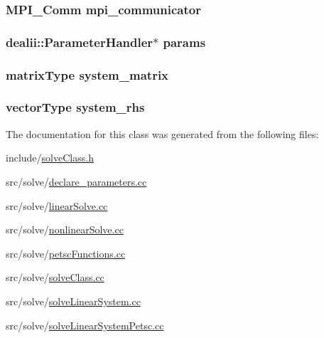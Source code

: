 \subsubsection[{mpi\-\_\-communicator}]{\setlength{\rightskip}{0pt plus 5cm}M\-P\-I\-\_\-\-Comm mpi\-\_\-communicator}\label{classsolve_class_a03728ed636ca889ae407c84d181bc611}
\subsubsection[{params}]{\setlength{\rightskip}{0pt plus 5cm}dealii\-::\-Parameter\-Handler$\ast$ params}\label{classsolve_class_accca5aede13ea52f0c11dff4daf1ad97}
\subsubsection[{system\-\_\-matrix}]{\setlength{\rightskip}{0pt plus 5cm}matrix\-Type system\-\_\-matrix}\label{classsolve_class_a56f7357eb335f9ce4ac30bc30d7513e8}
\subsubsection[{system\-\_\-rhs}]{\setlength{\rightskip}{0pt plus 5cm}vector\-Type system\-\_\-rhs}\label{classsolve_class_a6c39fa839fdc40d2408946617a778571}


The documentation for this class was generated from the following files\-:\begin{DoxyCompactItemize}
\item 
include/\hyperlink{solve_class_8h}{solve\-Class.\-h}\item 
src/solve/\hyperlink{declare__parameters_8cc}{declare\-\_\-parameters.\-cc}\item 
src/solve/\hyperlink{linear_solve_8cc}{linear\-Solve.\-cc}\item 
src/solve/\hyperlink{nonlinear_solve_8cc}{nonlinear\-Solve.\-cc}\item 
src/solve/\hyperlink{petsc_functions_8cc}{petsc\-Functions.\-cc}\item 
src/solve/\hyperlink{solve_class_8cc}{solve\-Class.\-cc}\item 
src/solve/\hyperlink{solve_linear_system_8cc}{solve\-Linear\-System.\-cc}\item 
src/solve/\hyperlink{solve_linear_system_petsc_8cc}{solve\-Linear\-System\-Petsc.\-cc}\end{DoxyCompactItemize}
